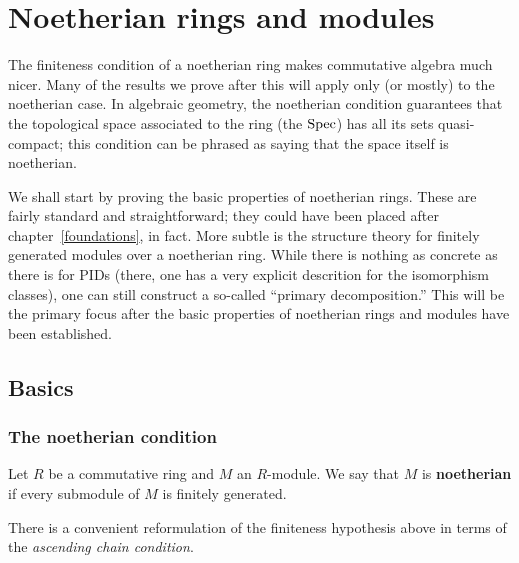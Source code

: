 \chapter{Noetherian rings and modules}
\label{noetherian}

The finiteness condition of a noetherian ring makes commutative algebra much
nicer.
Many of the results we prove after this will apply only (or mostly) to the
noetherian case. In algebraic geometry, the noetherian condition guarantees
that the topological space associated to the ring (the $\operatorname{Spec} $) has all its
sets quasi-compact; this condition can be phrased as saying that the space
itself is noetherian. 

We shall start by proving the basic properties of noetherian rings. These are
fairly standard and straightforward; they could have been placed after
chapter~\ref{foundations}, in fact. More subtle is the structure theory for
finitely generated modules over a noetherian ring. While there is nothing as
concrete as there is for PIDs (there, one has a very explicit descrition for
the isomorphism classes), one can still construct a so-called ``primary
decomposition.'' This will be the primary focus after the basic properties of
noetherian rings and modules have been established.


\section{Basics}

\subsection{The noetherian condition}


\begin{definition} 
Let $R$ be a commutative ring and $M$ an $R$-module. We say that $M$ is
\textbf{noetherian} if every submodule of $M$ is finitely generated.
\end{definition} 


There is a convenient
reformulation of the finiteness hypothesis above in terms of the
\emph{ascending chain condition}.

